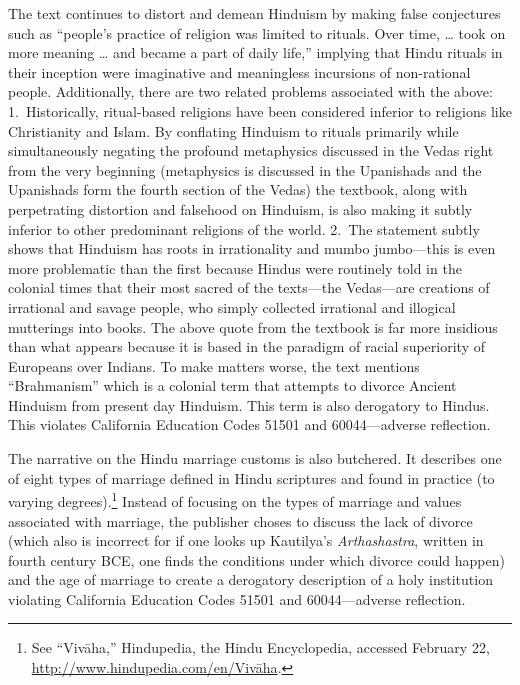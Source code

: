 The text continues to distort and demean Hinduism by making false conjectures such as “people’s practice of religion was limited to rituals. Over time, … took on more meaning … and became a part of daily life,” implying that Hindu rituals in their inception were imaginative and meaningless incursions of non-rational people. Additionally, there are two related problems associated with the above: 1.\ Historically, ritual-based religions have been considered inferior to religions like Christianity and Islam. By conflating Hinduism to rituals primarily while simultaneously negating the profound metaphysics discussed in the Vedas right from the very beginning (metaphysics is discussed in the Upanishads and the Upanishads form the fourth section of the Vedas) the textbook, along with perpetrating distortion and falsehood on Hinduism, is also making it subtly inferior to other predominant religions of the world. 2.\ The statement subtly shows that Hinduism has roots in irrationality and mumbo jumbo—this is even more problematic than the first because Hindus were routinely told in the colonial times that their most sacred of the texts—the Vedas—are creations of irrational and savage people, who simply collected irrational and illogical mutterings into books. The above quote from the textbook is far more insidious than what appears because it is based in the paradigm of racial superiority of Europeans over Indians. To make matters worse, the text mentions “Brahmanism” which is a colonial term that attempts to divorce Ancient Hinduism from present day Hinduism. This term is also derogatory to Hindus. This violates California Education Codes 51501 and 60044—adverse reflection.  

The narrative on the Hindu marriage customs is also butchered. It describes one of eight types of marriage defined in Hindu scriptures and found in practice (to varying degrees).\footnote{See “Vivāha,” Hindupedia, the Hindu Encyclopedia, accessed 	February 22, \url{http://www.hindupedia.com/en/Vivāha}.} Instead of focusing on the types of marriage and values associated with marriage, the publisher choses to discuss the lack of divorce (which also is incorrect for if one looks up Kautilya’s \textit{Arthashastra},  written in fourth century BCE, one finds the conditions under which divorce could happen) and the age of marriage to create a derogatory description of a holy institution violating California Education Codes 51501 and 60044—adverse reflection.  

